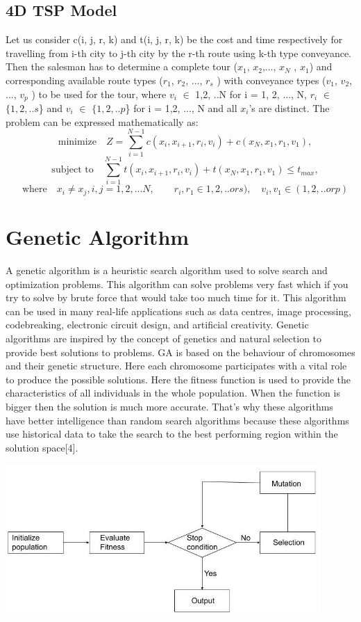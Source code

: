 \documentclass{article}
\begin{document}
\subsection{4D TSP Model}
Let us consider c(i, j, r, k) and t(i, j, r, k) be the cost and time respectively for travelling from i-th city to j-th city by the r-th
route using k-th type conveyance. Then the salesman has to determine a complete tour ($x_1$, $x_2$,..., $x_N$ , $x_1$) and
corresponding available route types ($r_1$, $r_2$, ..., $r_s$ ) with conveyance types ($v_1$, $v_2$, ..., $v_p$ ) to be used for the tour,
where $v_i$ $\in$ {1,2, ..N} for i = 1, 2, ..., N, $r_i$ $\in$ $\{1, 2, ..s$\} and $v_i$ $\in$ $\{1,2, ..p$\} for i = 1,2, ..., N and
all $x_i$'s are distinct. The problem can be expressed mathematically as:
\[
\quad \textrm{minimize}\quad Z =\sum^{N-1}_{i=1} c(x_i,x_{i+1},r_i,v_i)+c(x_N,x_1,r_1,v_1), \] 
\[ \quad \textrm{subject to}\quad\sum^{N-1}_{i=1} t(x_i,x_{i+1},r_i,v_i)+t(x_N,x_1,r_1,v_1)\leq t_{max},\]
\[
\quad \textrm{where}\quad x_i \ne x_j,i,j=1,2,...N,\quad \textrm{}\quad r_i,r_1 \in 1,2,..ors),\quad v_i,v_1 \in (1,2,..orp)
\]

\section{Genetic Algorithm}
A genetic algorithm is a heuristic search algorithm used to solve search and optimization problems. This algorithm
can solve problems very fast which if you try to solve by brute force that would take too much time for it. This
algorithm can be used in many real-life applications such as data centres, image processing, codebreaking,
electronic circuit design, and artificial creativity. Genetic algorithms are inspired by the concept of genetics and
natural selection to provide best solutions to problems. GA is based on the behaviour of chromosomes and their
genetic structure. Here each chromosome participates with a vital role to produce the possible solutions. Here the
fitness function is used to provide the characteristics of all individuals in the whole population. When the function is
bigger then the solution is much more accurate. That's why these algorithms have better intelligence than random
search algorithms because these algorithms use historical data to take the search to the best performing region within
the solution space[4].
\begin{center}
    \includegraphics[width=12cm]{Untitled drawing (1).jpg}
\end{center}
\end{document}
